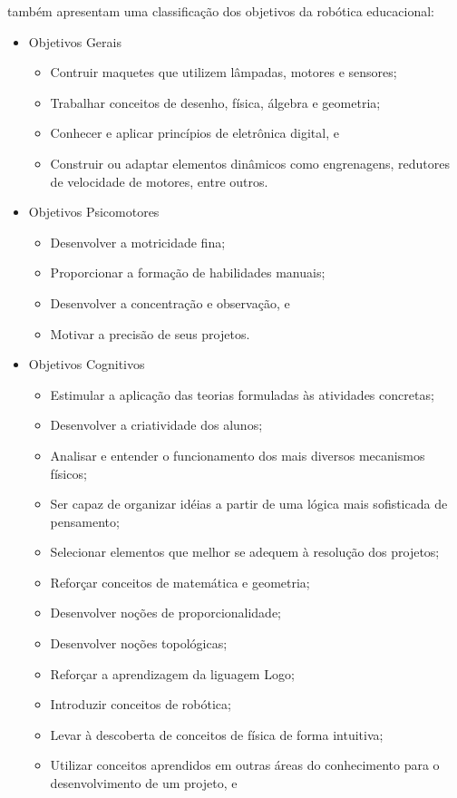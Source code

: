 \cite{zilli2004robotica} também apresentam uma classificação dos objetivos da robótica educacional:
\begin{itemize}
\item Objetivos Gerais
\begin{itemize}
\item Contruir maquetes que utilizem lâmpadas, motores e sensores;
\item Trabalhar conceitos de desenho, física, álgebra e geometria;
\item Conhecer e aplicar princípios de eletrônica digital, e
\item Construir ou adaptar elementos dinâmicos como engrenagens, redutores de velocidade de motores, entre outros.
\end{itemize}
\item Objetivos Psicomotores
\begin{itemize}
\item Desenvolver a motricidade fina;
\item Proporcionar a formação de habilidades manuais;
\item Desenvolver a concentração e observação, e
\item Motivar a precisão de seus projetos.
\end{itemize}
\item Objetivos Cognitivos
\begin{itemize}
\item Estimular a aplicação das teorias formuladas às atividades concretas;
\item Desenvolver a criatividade dos alunos;
\item Analisar e entender o funcionamento dos mais diversos mecanismos físicos;
\item Ser capaz de organizar idéias a partir de uma lógica mais sofisticada de pensamento;
\item Selecionar elementos que melhor se adequem à resolução dos projetos;
\item Reforçar conceitos de matemática e geometria;
\item Desenvolver noções de proporcionalidade;
\item Desenvolver noções topológicas;
\item Reforçar a aprendizagem da liguagem Logo;
\item Introduzir conceitos de robótica;
\item Levar à descoberta de conceitos de física de forma intuitiva;
\item Utilizar conceitos aprendidos em outras áreas do conhecimento para o desenvolvimento de um projeto, e

\end{itemize}
\end{itemize}
